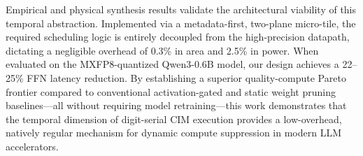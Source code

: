 \documentclass[sigconf]{acmart}
\begin{document}
Empirical and physical synthesis results validate the architectural viability of this temporal abstraction. Implemented via a metadata-first, two-plane micro-tile, the required scheduling logic is entirely decoupled from the high-precision datapath, dictating a negligible overhead of 0.3\% in area and 2.5\% in power. When evaluated on the MXFP8-quantized Qwen3-0.6B model, our design achieves a 22--25\% FFN latency reduction. By establishing a superior quality-compute Pareto frontier compared to conventional activation-gated and static weight pruning baselines---all without requiring model retraining---this work demonstrates that the temporal dimension of digit-serial CIM execution provides a low-overhead, natively regular mechanism for dynamic compute suppression in modern LLM accelerators.




\end{document}
